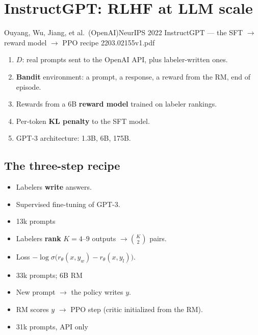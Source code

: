 \section{InstructGPT: RLHF at LLM scale}

  {Ouyang, Wu, Jiang, et al.\ (OpenAI)}{NeurIPS 2022}
  {InstructGPT --- the SFT $\to$ reward model $\to$ PPO recipe}
  {2203.02155v1.pdf}

\begin{enumerate}
  \item $D$: real prompts sent to the OpenAI API, plus labeler-written ones.
  \item \textbf{Bandit} environment: a prompt, a response, a reward from the RM, end of episode.
  \item Rewards from a 6B \textbf{reward model} trained on labeler rankings.
  \item Per-token \textbf{KL penalty} to the SFT model.
  \item GPT-3 architecture: 1.3B, 6B, 175B.
\end{enumerate}

\subsection{The three-step recipe}

\begin{pair}[3]
\begin{slatebox}[title={1. SFT}]
\small
\begin{itemize}
  \item Labelers \textbf{write} answers.
  \item Supervised fine-tuning of GPT-3.
  \item {\color{NoteGray}13k prompts}
\end{itemize}
\end{slatebox}
\begin{warmbox}[title={2. Reward model}]
\small
\begin{itemize}
  \item Labelers \textbf{rank} $K=4$--$9$ outputs $\to\binom K2$ pairs.
  \item Loss $-\log\sigma\big(r_\theta(x,y_w)-r_\theta(x,y_l)\big)$.
  \item {\color{NoteGray}33k prompts; 6B RM}
\end{itemize}
\end{warmbox}
\begin{coolbox}[title={3. PPO}]
\small
\begin{itemize}
  \item New prompt $\to$ the policy writes $y$.
  \item RM scores $y$ $\to$ PPO step (critic initialized from the RM).
  \item {\color{NoteGray}31k prompts, API only}
\end{itemize}
\end{coolbox}
\end{pair}

